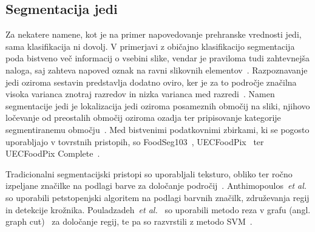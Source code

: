 \documentclass[a4paper,twoside,openright,12pt,slovene]{book}
\newcommand{\etal}{\textit{et al.}} %
\begin{document}
        \subsection{Segmentacija jedi}

            Za nekatere namene, kot je na primer napovedovanje prehranske
            vrednosti jedi, sama klasifikacija ni dovolj. V primerjavi z
            običajno klasifikacijo segmentacija poda bistveno več informacij o
            vsebini slike, vendar je praviloma tudi zahtevnejša naloga, saj
            zahteva napoved oznak na ravni slikovnih
            elementov~\cite{src:konstantakopoulos2023review,
            src:minaee2021image}. Razpoznavanje jedi oziroma sestavin
            predstavlja dodatno oviro, ker je za to področje značilna visoka
            varianca znotraj razredov in nizka varianca med
            razredi~\cite{src:wu2021large}. Namen segmentacije jedi je
            lokalizacija jedi oziroma posameznih območij na sliki, njihovo
            ločevanje od preostalih območij oziroma ozadja ter pripisovanje
            kategorije segmentiranemu
            območju~\cite{src:konstantakopoulos2023review}.
            Med bistvenimi podatkovnimi zbirkami, ki se pogosto uporabljajo v
            tovrstnih pristopih, so FoodSeg103~\cite{src:wu2021large},
            UECFoodPix~\cite{src:ege2019new} ter UECFoodPix
            Complete~\cite{src:okamoto2021uec}.

            Tradicionalni segmentacijski pristopi so uporabljali teksturo,
            obliko ter ročno izpeljane značilke na podlagi barve za določanje
            področij~\cite{src:konstantakopoulos2023review}. 
            Anthimopoulos~\etal~\cite{src:anthimopoulos2013segmentation} so
            uporabili petstopenjski algoritem na podlagi barvnih značilk, združevanja regij in detekcije krožnika.
            Pouladzadeh~\etal~\cite{src:pouladzadeh2014using} so uporabili
            metodo reza v grafu (angl. graph
            cut)~\cite{src:boykov2001interactive-graphcut} za določanje regij,
            te pa so razvrstili z metodo SVM~\cite{src:cortes1995svm}.
\end{document}
